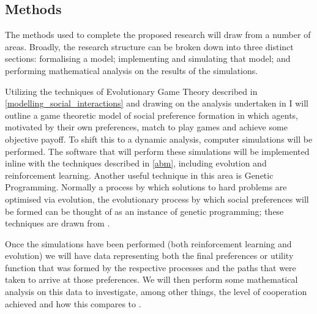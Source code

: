 \documentclass[11pt]{article}
\newcommand*{\np}{\par\noindent\newline}
\begin{document}
\subsection{Methods}
The methods used to complete the proposed research will draw from a number of
areas. Broadly, the research structure can be broken down into three distinct
sections: formalising a model; implementing and simulating that model; and
performing mathematical analysis on the results of the simulations.
\np Utilizing the techniques of Evolutionary Game Theory described in
\ref{modelling_social_interactions} and drawing on the analysis undertaken in
\cite{alger_homo_2013} I will outline a game theoretic model of social
preference formation in which agents, motivated by their own preferences, match
to play games and achieve some objective payoff. To shift this to a dynamic
analysis, computer simulations will be performed. The software that will
perform these simulations will be implemented inline with the techniques
described in \ref{abm}, including evolution and reinforcement learning. Another
useful technique in this area is Genetic Programming. Normally a process by
which solutions to hard problems are optimised via evolution, the evolutionary
process by which social preferences will be formed can be thought of as an
instance of genetic programming; these techniques are drawn from
\cite{poli_field_2008}.
\np Once the simulations have been performed (both reinforcement learning and
evolution) we will have data representing both the final preferences or
utility function that was formed by the respective processes and the paths
that were taken to arrive at those preferences. We will then perform some
mathematical analysis on this data to investigate, among other things, the
level of cooperation achieved and how this compares to \cite{alger_homo_2013}.
\end{document}
